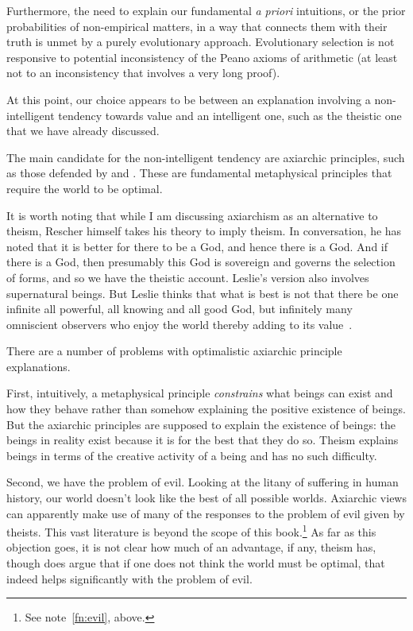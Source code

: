Furthermore, the need to explain our fundamental \textit{a priori} intuitions, or the prior probabilities
of non-empirical matters, in a way that connects them with their truth
is unmet by a purely evolutionary approach. Evolutionary selection is not responsive to potential inconsistency of the Peano axioms of arithmetic (at least not to an inconsistency that involves a very long proof).

At this point, our choice appears to be between an explanation involving a non-intelligent tendency towards value and an intelligent one,
such as the theistic one that we have already discussed.

The main candidate for the non-intelligent tendency are axiarchic principles, such as those defended by  and .
These are fundamental metaphysical principles that require the world to be optimal. 

It is worth noting that while I am discussing axiarchism as an alternative to theism, Rescher himself takes his theory to
imply theism. In conversation, he has noted that it is better for there to be a God, and hence there is a God. And if there is a God, then presumably this God
is sovereign and governs the selection of forms, and so we have the theistic account. Leslie's version also
involves supernatural beings. But Leslie thinks that what is best is not that there be one infinite all powerful, all knowing
and all good God, but infinitely many omniscient observers who enjoy the world thereby adding to its value~\parencite{LeslieIM}.

There are a number of problems with optimalistic axiarchic principle explanations.

First, intuitively, a metaphysical principle \textit{constrains} what beings can exist and how they behave rather than somehow 
explaining the positive existence of beings. But the axiarchic principles are supposed to explain the existence of beings: the beings
in reality exist because it is for the best that they do so.  Theism explains beings in terms of the creative
activity of a being and has no such difficulty.

Second, we have the problem of evil. Looking at the litany of suffering in human history, 
our world doesn't look like the best of all possible worlds. Axiarchic views can apparently make use of many of the responses to 
the problem of evil given by theists. This vast literature is beyond the scope of this book.\footnote{See 
note~\ref{fn:evil}, above.}
As far as this objection goes, it is not clear how much of an advantage, if any, theism has, though 
 does argue that if one does not think the world must be optimal, that indeed 
helps significantly with the problem of evil.

